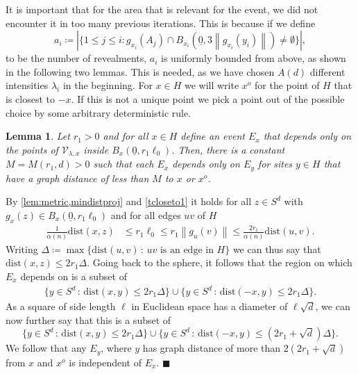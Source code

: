 \documentclass[11pt]{article}%
\newenvironment{proof}{\vspace{1ex}\noindent{\bf Proof.}}{\hspace*{\fill}$\blacksquare$\vspace{1ex}}
\newtheorem{lemma}[lemma]{Lemma}
\newcommand{\norm}[1]{\ensuremath{\left\|#1\right\|}}
\newcommand{\dists}{{\mathrm{dist}}}
\newcommand{\typ}{\underline{0}}
\begin{document}
    \noindent
	It is important that for the area that is relevant for the event, we did not encounter it in too many previous iterations. This is because if we define  
	\begin{equation*}
		a_{i}\coloneqq | \{1\leq j\leq i: g_{x_i}(A_j)\cap B_{x_i}(\typ,3\norm{g_{x_i}(y_i)})\neq \emptyset \}|,
	\end{equation*}
	to be the number of revealments, $ a_i $ is uniformly bounded from above, as shown in the following two lemmas. This is needed, as we have chosen $ A(d) $ different intensities $ \lambda_i $ in the beginning. For $ x\in H $ we will write $ x^o $ for the point of $ H $ that is closest to $ -x $. If this is not a unique point we pick a point out of the possible choice by some arbitrary deterministic rule.
	\begin{lemma}\label{nointersect}
	 Let $ r_1>0 $ and for all $ x\in H $ define an event $ E_x $ that depends only on the points of $ \mathcal{V}_{\lambda,x} $ inside $ B_x(\typ, r_1\ell_0 ) $. Then, there is a constant $M=M(r_1,d)>0 $ such that each $ E_x $ depends only on $ E_y $ for sites $ y\in H $ that have a 
	 graph distance of less than $M$ to $ x $ or $ x^o $.
	\end{lemma}
\begin{proof}
By \cref{lem:metric,mindistproj} and \cref{tcloseto1} it holds for all $ z\in S^d $ with $ g_{x}(z)\in B_{x}(\typ,r_1\ell_0)  $ and for all edges $ uv $ of $ H $
\begin{equation*}
	\begin{split}
		\frac{1}{\alpha(n)}\dists(x,z)&\leq r_1\ell_0\leq r_1\norm{g_{u}(v)}\leq\frac{2r_1}{\alpha(n)}\dists(u,v).
	\end{split}
\end{equation*}
Writing $ \Delta\coloneqq \max\{\dists(u,v)\,:\, uv\text{ is an edge in } H\} $ we can thus say that $ \dists(x,z)\leq 2r_1\Delta $. Going back to the sphere, it follows that the region on which $  E_x $ depends on is a subset of
\begin{equation*}
	\begin{split}
		\{y\in S^d \, :\,\dists(x,y)\leq 2r_1\Delta \}\cup \{y\in S^d \, :\,\dists(-x,y)\leq 2r_1\Delta \}.
	\end{split}
\end{equation*}
As a square of side length $\ell$ in Euclidean space has a diameter of $\ell\sqrt{d}$, we can now further say that this is a subset of
\begin{equation*}
		\{y\in S^d \, :\,\dists(x,y)\leq 2r_1\Delta \}\cup \{y\in S^d \, :\,\dists(-x,y)\leq (2r_1+\sqrt{d})\Delta \}.
\end{equation*}
We follow that any $ E_y $, where $ y $ has graph distance of more than $ 2(2r_1+\sqrt{d}) $  from $ x $ and $ x^o $ is independent of $ E_x $.
\end{proof}
\end{document}

